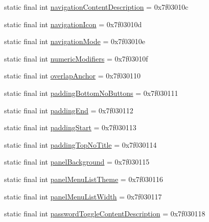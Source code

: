 \begin{DoxyCompactItemize}
\item 
static final int \mbox{\hyperlink{classandroid_1_1support_1_1design_1_1R_1_1attr_adaadd10648090e6b2f268643da9ec3c2}{navigation\+Content\+Description}} = 0x7f03010c
\item 
static final int \mbox{\hyperlink{classandroid_1_1support_1_1design_1_1R_1_1attr_a03bf46fdb71dfdbac72b15e3efe275df}{navigation\+Icon}} = 0x7f03010d
\item 
static final int \mbox{\hyperlink{classandroid_1_1support_1_1design_1_1R_1_1attr_a98ccf0c896c65512c88eaa5f71f6aa7c}{navigation\+Mode}} = 0x7f03010e
\item 
static final int \mbox{\hyperlink{classandroid_1_1support_1_1design_1_1R_1_1attr_ac310597451040d4fb015db1b10a08767}{numeric\+Modifiers}} = 0x7f03010f
\item 
static final int \mbox{\hyperlink{classandroid_1_1support_1_1design_1_1R_1_1attr_a38b3cd3ac2e4fc75a99b4c00c01d969e}{overlap\+Anchor}} = 0x7f030110
\item 
static final int \mbox{\hyperlink{classandroid_1_1support_1_1design_1_1R_1_1attr_a5c03c8654610ded8325a6a89aed8adb1}{padding\+Bottom\+No\+Buttons}} = 0x7f030111
\item 
static final int \mbox{\hyperlink{classandroid_1_1support_1_1design_1_1R_1_1attr_a92f0312d6082074b79517cc3af4cd8c5}{padding\+End}} = 0x7f030112
\item 
static final int \mbox{\hyperlink{classandroid_1_1support_1_1design_1_1R_1_1attr_a9fbcc904b65b8e0195daa4225c751809}{padding\+Start}} = 0x7f030113
\item 
static final int \mbox{\hyperlink{classandroid_1_1support_1_1design_1_1R_1_1attr_a923e0a0fff72b4db4678dc385da1c29f}{padding\+Top\+No\+Title}} = 0x7f030114
\item 
static final int \mbox{\hyperlink{classandroid_1_1support_1_1design_1_1R_1_1attr_a1825b20d558d4aaaa7919f1bc0a86a0f}{panel\+Background}} = 0x7f030115
\item 
static final int \mbox{\hyperlink{classandroid_1_1support_1_1design_1_1R_1_1attr_a9d1da2a3d76d5b857f71129133e00747}{panel\+Menu\+List\+Theme}} = 0x7f030116
\item 
static final int \mbox{\hyperlink{classandroid_1_1support_1_1design_1_1R_1_1attr_ab1e61ad48f90eadf6d64bb466f5d2a83}{panel\+Menu\+List\+Width}} = 0x7f030117
\item 
static final int \mbox{\hyperlink{classandroid_1_1support_1_1design_1_1R_1_1attr_ab86ef5f16fb45e852004797f85c9d962}{password\+Toggle\+Content\+Description}} = 0x7f030118

\end{DoxyCompactItemize}
